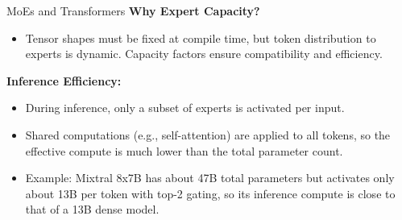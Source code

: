 \begin{frame}[allowframebreaks]{MoEs and Transformers}
    \textbf{Why Expert Capacity?}
    \begin{itemize}
        \item Tensor shapes must be fixed at compile time, but token distribution to experts is dynamic. Capacity factors ensure compatibility and efficiency.
    \end{itemize}

\framebreak

    \textbf{Inference Efficiency:}
    \begin{itemize}
        \item During inference, only a subset of experts is activated per input.
        \item Shared computations (e.g., self-attention) are applied to all tokens, so the effective compute is much lower than the total parameter count.
        \item Example: Mixtral 8x7B has about 47B total parameters but activates only about 13B per token with top-2 gating, so its inference compute is close to that of a 13B dense model.
    \end{itemize}
\end{frame}

